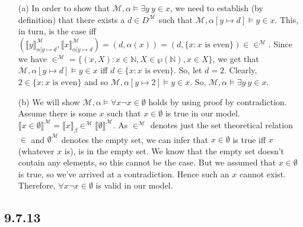 \begin{enumerate}

  \item[(a)] In order to show that $\mathcal{M},\alpha\vDash \exists
    y~y\in x$, we need to establish (by definition) that there exists
    a $d\in D^\mathcal{M}$ such that $\mathcal{M},\alpha[y\mapsto
    d]\vDash y\in x$. This, in turn, is the case iff $(\llbracket
    y\rrbracket^\mathcal{M}_{\alpha[y\mapsto d}, \llbracket
    x\rrbracket^\mathcal{M}_{\alpha[y\mapsto d})=(d, \alpha(x))=(d,
    \{x:x\text{ is even}\})\in \in ^\mathcal{M}$. Since we have
    $\in^\mathcal{M}=\{(x,X): x\in \mathbb{N}, X\in \wp(\mathbb{N}),
    x\in X\}$, we get that $\mathcal{M},\alpha[y\mapsto
    d]\vDash y\in x$ iff $d\in \{x:x\text{ is even}\}$. So, let
    $d=2$. Clearly, $2\in \{x:x\text{ is even}\}$ and so $\mathcal{M},\alpha[y\mapsto
    2]\vDash y\in x$. So, $\mathcal{M},\alpha\vDash \exists
    y~y\in x$.

  \item[(b)] We will show $\mathcal{M}, \alpha \vDash \forall x \neg x
    \in \emptyset$ holds by using proof by contradiction. Assume there
    is some $x$ such that $x \in \emptyset$ is true in our
    model. $\llbracket x \in \emptyset \rrbracket^\mathcal{M} =
    \llbracket x \rrbracket_\beta \in^\mathcal{M} \llbracket
    \emptyset\rrbracket^\mathcal{M}$. As $\in^\mathcal{M}$ denotes
    just the set theoretical relation $\in$ and
    $\emptyset^\mathcal{M}$ denotes the empty set, we can infer that
    $x \in \emptyset$ is true iff $x$ (whatever $x$ is), is in the
    empty set. We know that the empty set doesn't contain any
    elements, so this cannot be the case. But we assumed that $x \in
    \emptyset$ is true, so we've arrived at a contradiction. Hence
    such an $x$ cannot exist. Therefore, $\forall x \neg x \in
    \emptyset$ is valid in our model.
\end{enumerate}

\subsection*{9.7.13}

